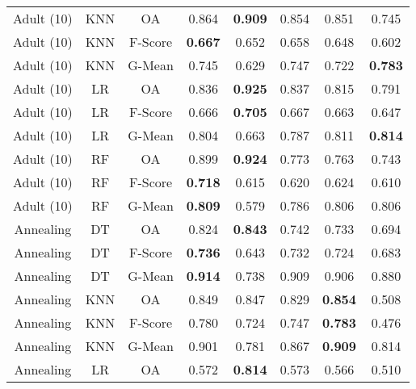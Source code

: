 \begin{longtable}{cccccccc}
        Adult (10) &        KNN &      OA &          0.864 & \textbf{0.909} &          0.854 &          0.851 &          0.745 \\
        Adult (10) &        KNN & F-Score & \textbf{0.667} &          0.652 &          0.658 &          0.648 &          0.602 \\
        Adult (10) &        KNN &  G-Mean &          0.745 &          0.629 &          0.747 &          0.722 & \textbf{0.783} \\
        Adult (10) &         LR &      OA &          0.836 & \textbf{0.925} &          0.837 &          0.815 &          0.791 \\
        Adult (10) &         LR & F-Score &          0.666 & \textbf{0.705} &          0.667 &          0.663 &          0.647 \\
        Adult (10) &         LR &  G-Mean &          0.804 &          0.663 &          0.787 &          0.811 & \textbf{0.814} \\
        Adult (10) &         RF &      OA &          0.899 & \textbf{0.924} &          0.773 &          0.763 &          0.743 \\
        Adult (10) &         RF & F-Score & \textbf{0.718} &          0.615 &          0.620 &          0.624 &          0.610 \\
        Adult (10) &         RF &  G-Mean & \textbf{0.809} &          0.579 &          0.786 &          0.806 &          0.806 \\
         Annealing &         DT &      OA &          0.824 & \textbf{0.843} &          0.742 &          0.733 &          0.694 \\
         Annealing &         DT & F-Score & \textbf{0.736} &          0.643 &          0.732 &          0.724 &          0.683 \\
         Annealing &         DT &  G-Mean & \textbf{0.914} &          0.738 &          0.909 &          0.906 &          0.880 \\
         Annealing &        KNN &      OA &          0.849 &          0.847 &          0.829 & \textbf{0.854} &          0.508 \\
         Annealing &        KNN & F-Score &          0.780 &          0.724 &          0.747 & \textbf{0.783} &          0.476 \\
         Annealing &        KNN &  G-Mean &          0.901 &          0.781 &          0.867 & \textbf{0.909} &          0.814 \\
         Annealing &         LR &      OA &          0.572 & \textbf{0.814} &          0.573 &          0.566 &          0.510 \\

\end{longtable}
